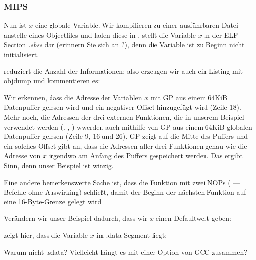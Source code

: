 \subsubsection{MIPS}

Nun ist $x$ eine globale Variable.
Wir kompilieren zu einer ausführbaren Datei anstelle eines Objectfiles und laden diese in \IDA.
\IDA stellt die Variable $x$ in der ELF Section \emph{.sbss} dar (erinnern Sie sich an ?), denn die Variable ist zu Beginn nicht initialisiert.


\IDA reduziert die Anzahl der Informationen; also erzeugen wir auch ein Listing mit objdump und kommentieren es:


Wir erkennen, dass die Adresse der Variablen $x$ mit GP aus einem 64KiB Datenpuffer gelesen wird und ein negativer
Offset hinzugefügt wird (Zeile 18). 
Mehr noch, die Adressen der drei externen Funktionen, die in unserem Beispiel verwendet werden (\puts, \scanf, \printf)
wwerden auch mithilfe von GP aus einem 64KiB globalen Datenpuffer gelesen (Zeile 9, 16 und 26).
GP zeigt auf die Mitte des Puffers und ein solches Offset gibt an, dass die Adressen aller drei Funktionen genau wie die
Adresse von $x$ irgendwo am Anfang des Puffers gespeichert werden. 
Das ergibt Sinn, denn unser Beispiel ist winzig.

Eine andere bemerkenswerte Sache ist, dass die Funktion mit zwei \ac{NOP}s ( --- Befehle ohne
Auswirking) schließt, damit der Beginn der nächsten Funktion auf eine 16-Byte-Grenze gelegt wird.


Verändern wir unser Beispiel dadurch, dass wir $x$ einen Defaultwert geben:



\IDA zeigt hier, dass die Variable $x$ im .data Segment liegt:


Warum nicht .sdata? Vielleicht hängt es mit einer Option von GCC zusammen?


